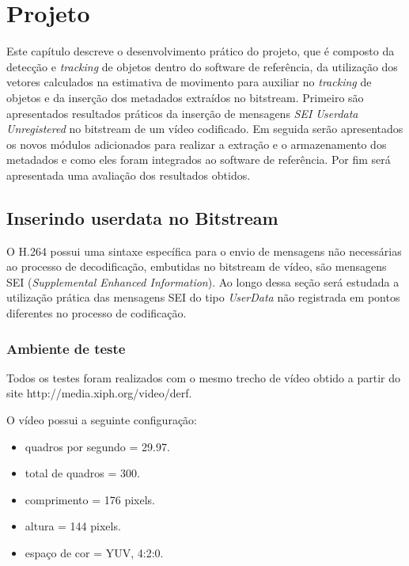 \chapter{Projeto}


Este capítulo descreve o desenvolvimento prático do projeto, que é composto da detecção e \textit{tracking} de objetos dentro do software de referência, da utilização dos vetores calculados na estimativa de movimento para auxiliar no \textit{tracking} de objetos e da inserção dos metadados extraídos no bitstream. Primeiro são apresentados resultados práticos da inserção de mensagens \textit{SEI Userdata Unregistered} no bitstream de um vídeo codificado. Em seguida serão apresentados os novos módulos adicionados para realizar a extração e o armazenamento dos metadados e como eles foram integrados ao software de referência. Por fim será apresentada uma avaliação dos resultados obtidos.


\section{Inserindo userdata no Bitstream}


O H.264 possui uma sintaxe específica para o envio de mensagens não necessárias ao processo de decodificação, embutidas no bitstream de vídeo, são mensagens SEI (\textit{Supplemental Enhanced Information}). Ao longo dessa seção será estudada a utilização prática das mensagens SEI do tipo \textit{UserData} não registrada em pontos diferentes no processo de codificação. 


\subsection{Ambiente de teste}

Todos os testes foram realizados com o mesmo trecho de vídeo obtido a partir do site http://media.xiph.org/video/derf.

O vídeo possui a seguinte configuração:

\begin{itemize}
        \item quadros por segundo = 29.97.
        \item total de quadros    = 300.
        \item comprimento         = 176 pixels.
        \item altura              = 144 pixels.
        \item espaço de cor       = YUV, 4:2:0.
\end{itemize}

